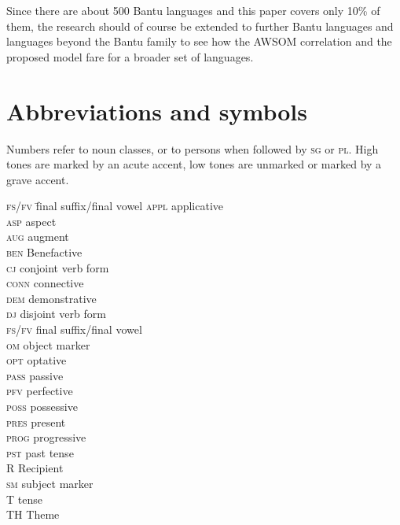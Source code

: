 \documentclass[output=paper
,modfonts
,nonflat]{langsci/langscibook}
\begin{document}
Since there are about 500 Bantu languages and this paper covers only 10\% of them, the research should of course be extended to further Bantu languages and languages beyond the Bantu family to see how the AWSOM correlation and the proposed model fare for a broader set of languages.


\section*{Abbreviations and symbols}
Numbers refer to noun classes, or to persons when followed by \textsc{sg} or \textsc{pl}. High tones are marked by an acute accent, low tones are unmarked or marked by a grave accent.
\begin{multicols}{2}
		\begin{tabbing}
			\textsc{fs/fv}\hspace{5mm} \= final suffix/final vowel\kill
		\textsc{appl} 	\> applicative \\
		\textsc{asp} 	\> aspect \\ 	
		\textsc{aug} 	\> augment 	\\					
		\textsc{ben} 	\> Benefactive \\	
		\textsc{cj} 	\> conjoint verb form 	\\		 
		\textsc{conn} \> connective \\	
		\textsc{dem}	\> demonstrative \\				 
		\textsc{dj} 	\> disjoint verb form \\ 
		\textsc{fs/fv} 	\> final suffix/final vowel 	\\	 
		\textsc{om} 	\> object marker \\	
		\textsc{opt}	\> optative \\						 
		\textsc{pass} \> passive \\	
		\textsc{pfv} \> perfective 	\\				 
		\textsc{poss} \> possessive \\	
		\textsc{pres} 	\> present 	\\					 
		\textsc{prog} \> progressive \\	
		\textsc{pst} 	\> past tense 	\\				 
		R 			\> Recipient \\	
		\textsc{sm} 	\> subject marker \\				
		T 			\> tense \\	
		TH 				\> Theme 										
	\end{tabbing} 
\end{multicols}
\end{document}
